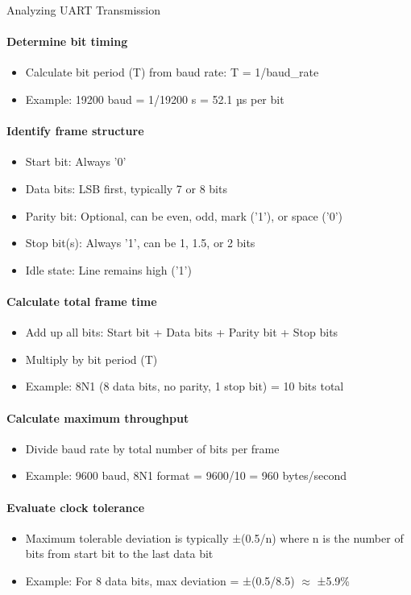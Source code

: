 \begin{KR}{Analyzing UART Transmission}\\
\paragraph{Determine bit timing}
\begin{itemize}
    \item Calculate bit period (T) from baud rate: T = 1/baud\_rate
    \item Example: 19200 baud = 1/19200 s = 52.1 µs per bit
\end{itemize}

\paragraph{Identify frame structure}
\begin{itemize}
    \item Start bit: Always '0'
    \item Data bits: LSB first, typically 7 or 8 bits
    \item Parity bit: Optional, can be even, odd, mark ('1'), or space ('0')
    \item Stop bit(s): Always '1', can be 1, 1.5, or 2 bits
    \item Idle state: Line remains high ('1')
\end{itemize}

\paragraph{Calculate total frame time}
\begin{itemize}
    \item Add up all bits: Start bit + Data bits + Parity bit + Stop bits
    \item Multiply by bit period (T)
    \item Example: 8N1 (8 data bits, no parity, 1 stop bit) = 10 bits total
\end{itemize}

\paragraph{Calculate maximum throughput}
\begin{itemize}
    \item Divide baud rate by total number of bits per frame
    \item Example: 9600 baud, 8N1 format = 9600/10 = 960 bytes/second
\end{itemize}

\paragraph{Evaluate clock tolerance}
\begin{itemize}
    \item Maximum tolerable deviation is typically ±(0.5/n) where n is the number of bits from start bit to the last data bit
    \item Example: For 8 data bits, max deviation = ±(0.5/8.5) $\approx$ ±5.9\%
\end{itemize}
\end{KR}

